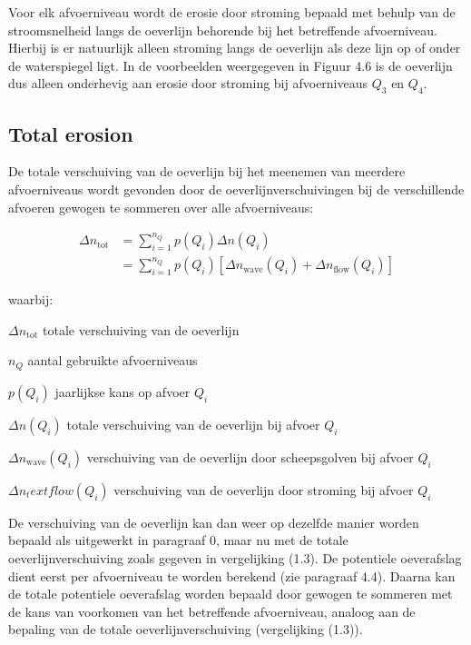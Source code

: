 Voor elk afvoerniveau wordt de erosie door stroming bepaald met behulp van de stroomsnelheid langs de oeverlijn behorende bij het betreffende afvoerniveau.
Hierbij is er natuurlijk alleen stroming langs de oeverlijn als deze lijn op of onder de waterspiegel ligt.
In de voorbeelden weergegeven in Figuur 4.6 is de oeverlijn dus alleen onderhevig aan erosie door stroming bij afvoerniveaus $Q_3$ en $Q_4$.

\subsection{Total erosion}

De totale verschuiving van de oeverlijn bij het meenemen van meerdere afvoerniveaus wordt gevonden door de oeverlijnverschuivingen bij de verschillende afvoeren gewogen te sommeren over alle afvoerniveaus:

\begin{align}
\Delta n_\text{tot} &= \sum_{i=1}^{n_Q} p(Q_i) \Delta n(Q_i) \\
                    &= \sum_{i=1}^{n_Q} p(Q_i) \left [ \Delta n_\text{wave}(Q_i) + \Delta n_\text{flow}(Q_i) \right ]
\label{Eq1.3}
\end{align}

waarbij:

\begin{symbollist}
\item[$\Delta n_\text{tot}$]  totale verschuiving van de oeverlijn 
\item[$n_Q$] aantal gebruikte afvoerniveaus \unitbrackets{-}
\item[$p(Q_i)$] jaarlijkse kans op afvoer $Q_i$ \unitbrackets{-}
\item[$\Delta n(Q_i)$] totale verschuiving van de oeverlijn bij afvoer $Q_i$ 
\item[$\Delta n_\text{wave}(Q_i)$] verschuiving van de oeverlijn door scheepsgolven bij afvoer $Q_i$ 
\item[$\Delta n_text{flow}(Q_i)$] verschuiving van de oeverlijn door stroming bij afvoer $Q_i$ 
\end{symbollist}

De verschuiving van de oeverlijn kan dan weer op dezelfde manier worden bepaald als uitgewerkt in paragraaf 0, maar nu met de totale oeverlijnverschuiving zoals gegeven in vergelijking (1.3).
De potentiele oeverafslag dient eerst per afvoerniveau te worden berekend (zie paragraaf 4.4).
Daarna kan de totale potentiele oeverafslag worden bepaald door gewogen te sommeren met de kans van voorkomen van het betreffende afvoerniveau, analoog aan de bepaling van de totale oeverlijnverschuiving (vergelijking (1.3)).

